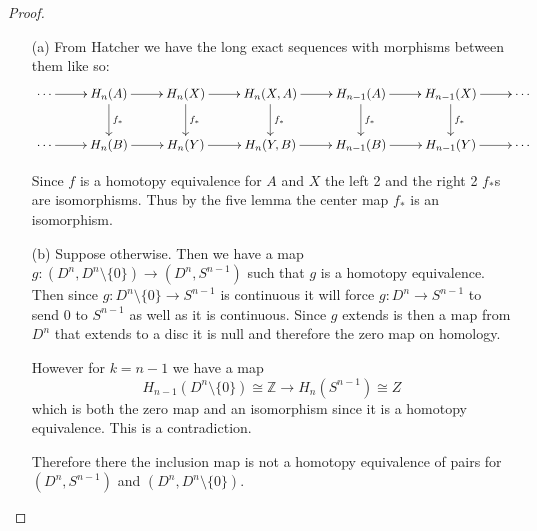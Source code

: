 \documentclass[10pt]{article}
\newcommand{\bb}[1]{\mathbb{#1}}
\theoremstyle{plain}
\theoremstyle{remark}
\begin{document}
\begin{proof}
  \begin{enumerate}
  \item[(a)] From Hatcher we have the long exact sequences with morphisms
    between them like so:
    \[
      \xymatrix{
        \cdots \ar[r] & H_n(A) \ar[r] \ar[d]^{f_*} & H_n(X) \ar[r] \ar[d]^{f_*} & H_n(X,A) \ar[r] \ar[d]^{f_*} & H_{n-1}(A) \ar[r] \ar[d]^{f_*} & H_{n-1}(X) \ar[r] \ar[d]^{f_*} & \cdots \\
        \cdots \ar[r] & H_n(B) \ar[r] & H_n(Y) \ar[r] & H_n(Y,B) \ar[r] & H_{n-1}(B) \ar[r] & H_{n-1}(Y) \ar[r] & \cdots
      }
    \]

    Since $f$ is a homotopy equivalence for $A$ and $X$ the left 2 and the right 2 $f_*$s
    are isomorphisms. Thus by the five lemma the center map $f_*$ is an
    isomorphism.
  \item[(b)] Suppose otherwise. Then we have a map $g:(D^n,D^n\setminus\{0\})\rightarrow(D^n,S^{n-1})$
    such that $g$ is a homotopy equivalence. Then since $g:D^n\setminus\{0\}\rightarrow S^{n-1}$
    is continuous it will force $g:D^n\rightarrow S^{n-1}$ to send $0$ to $S^{n-1}$ as
    well as it is continuous. Since $g$ extends is then a map from $D^n$ that
    extends to a disc it is null and therefore the zero map on homology.

    However for $k=n-1$ we have a map
    \[
      H_{n-1}(D^n\setminus\{0\})\cong \bb{Z}\rightarrow H_n(S^{n-1}) \cong Z
    \]
    which is both the zero map and an isomorphism since it is a homotopy
    equivalence. This is a contradiction.

    Therefore there the inclusion map is not a homotopy equivalence of
    pairs for $(D^n,S^{n-1})$ and $(D^n,D^n\setminus\{0\})$.
  \end{enumerate}
\end{proof}

\end{document}
